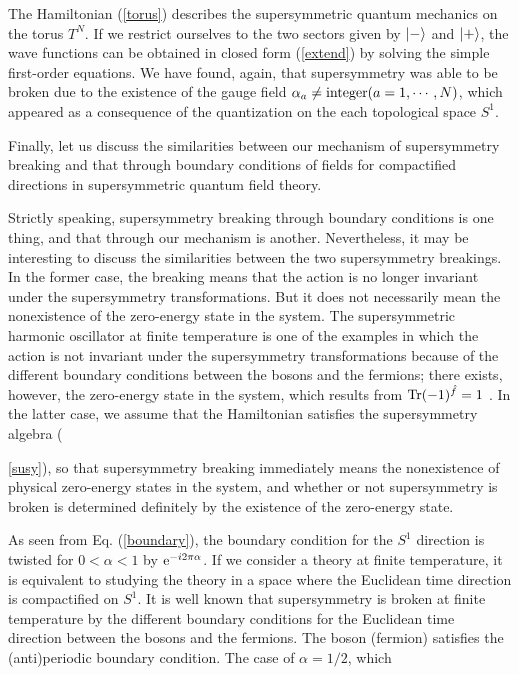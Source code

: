 \documentclass[a4paper,12pt]{article}
\begin{document}
{The Hamiltonian (\ref{torus}) describes the supersymmetric quantum mechanics 
on the torus $T^N$. If we restrict ourselves to the 
two sectors given by $|{-}\rangle$ and $|{+}\rangle$, the wave functions 
can be obtained in closed form (\ref{extend}) by solving the simple 
first-order equations. We have found, again, that supersymmetry 
was able to be broken due to the existence of the gauge 
field $\alpha_a \neq {\rm integer}(a=1, \cdots, N)$, which appeared  
as a consequence of the quantization on the each topological space $S^1$. 
\par
Finally, let us discuss the similarities between our mechanism of 
supersymmetry breaking and that through boundary conditions
of fields for compactified directions in 
supersymmetric quantum field theory.
\par
Strictly speaking, supersymmetry breaking through boundary conditions
is one thing, and that through our mechanism is another.
Nevertheless, it may be interesting to discuss the similarities
between the two supersymmetry breakings. 
In the former case, the breaking means that the action is no 
longer invariant under the supersymmetry transformations. But it does 
not necessarily mean the nonexistence of the zero-energy state 
in the system. The supersymmetric 
harmonic oscillator at finite temperature is one of the examples in which
the action is not invariant under the supersymmetry transformations 
because of the different boundary conditions between the bosons and the 
fermions; there exists, however, the zero-energy state in the system, which 
results from ${\rm Tr}(-1)^{{\hat f}}=1$ \cite{fuchs}. 
In the latter case, we  assume  
that the Hamiltonian satisfies the supersymmetry algebra ({\ref{susy}), so 
that supersymmetry breaking immediately
means the nonexistence of physical zero-energy states 
in the system, and whether 
or not supersymmetry is broken is determined definitely
by the existence of the zero-energy state. 
\par
As seen from Eq. (\ref{boundary}), the boundary condition for the $S^1$ 
direction is twisted for $0 < \alpha < 1$ by ${\rm e}^{-i2\pi\alpha}$. 
If we consider a theory at finite temperature, it is equivalent to studying
the theory in a space where the Euclidean time direction 
is compactified on $S^1$. 
It is well known that supersymmetry is broken at finite
temperature by the different boundary conditions 
for the Euclidean time direction between the bosons and the fermions. 
The boson (fermion) satisfies 
the (anti)periodic boundary condition. The case of $\alpha=1/2$, which 
}}
\end{document}
